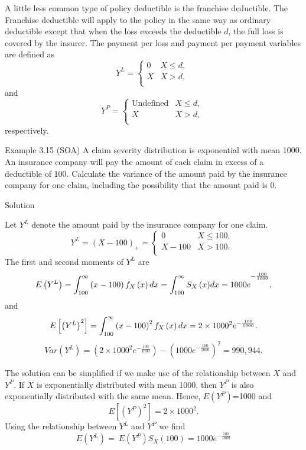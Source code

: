 \documentclass[]{book}
\begin{document}
A little less common type of policy deductible is the franchise
deductible. The Franchise deductible will apply to the policy in the
same way as ordinary deductible except that when the loss exceeds the
deductible \(d\), the full loss is covered by the insurer. The payment
per loss and payment per payment variables are defined as
\[Y^{L} = \left\{ \begin{matrix}
0 & X \leq d, \\
X & X > d, \\
\end{matrix} \right.\ \] and \[Y^{P} = \left\{ \begin{matrix}
\text{Undefined} & X \leq d, \\
X & X > d, \\
\end{matrix} \right.\ \] respectively.

Example 3.15 (SOA) A claim severity distribution is exponential with
mean 1000. An insurance company will pay the amount of each claim in
excess of a deductible of 100. Calculate the variance of the amount paid
by the insurance company for one claim, including the possibility that
the amount paid is 0.

Solution

Let \(Y^{L}\) denote the amount paid by the insurance company for one
claim. \[Y^{L} = \left( X - 100 \right)_{+} = \left\{ \begin{matrix}
0 & X \leq 100, \\
X - 100 & X > 100. \\
\end{matrix} \right.\ \] The first and second moments of \(Y^{L}\) are
\[E\left( Y^{L} \right) = \int_{100}^{\infty}\left( x - 100 \right)f_{X}\left( x \right)dx \\
= {\int_{100}^{\infty}{S_{X}\left( x \right)}dx = 1000e}^{- \frac{100}{1000}},\]
and
\[E\left\lbrack \left( Y^{L} \right)^{2} \right\rbrack = \int_{100}^{\infty}\left( x - 100 \right)^{2}f_{X}\left( x \right)dx \\
= 2 \times 1000^{2}e^{- \frac{100}{1000}}.\]
\[Var\left( Y^{L} \right) = \left( 2 \times 1000^{2}e^{- \frac{100}{1000}} \right) - \left( {1000e}^{- \frac{100}{1000}} \right)^{2} = 990,944.\]

The solution can be simplified if we make use of the relationship
between \(X\) and \(Y^{P}\). If \(X\) is exponentially distributed with
mean 1000, then \(Y^{P}\) is also exponentially distributed with the
same mean. Hence, \(E\left( Y^{P} \right)\)=1000 and
\[E\left\lbrack \left( Y^{P} \right)^{2} \right\rbrack = 2 \times 1000^{2}.\]
Using the relationship between \(Y^{L}\) and \(Y^{P}\) we find
\[E\left( Y^{L} \right) = \ E\left( Y^{P} \right)S_{X}\left( 100 \right){= 1000e}^{- \frac{100}{1000}}\]
\end{document}
